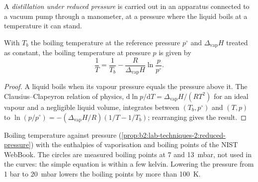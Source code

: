 \begin{definition}\label{def:b2:lab-techniques-2:reduced-pressure}
A \emph{distillation under reduced pressure} is carried out
in an apparatus connected to a vacuum pump through a manometer, at a pressure where the liquid boils at a
temperature it can stand.
\end{definition}

\begin{proposition}\label{prop:b2:lab-techniques-2:reduced-pressure}
With $T_b$ the boiling temperature at the reference pressure $p^\circ$ and $\Delta_{\mathrm{vap}}H$
treated as constant, the boiling temperature at pressure $p$ is given by
\begin{equation*}
\frac{1}{T} = \frac{1}{T_b} - \frac{R}{\Delta_{\mathrm{vap}}H}\ln\frac{p}{p^\circ}.
\end{equation*}
\end{proposition}

\begin{proof}
A liquid boils when its vapour pressure equals the pressure above it. The Clausius--Clapeyron relation
of physics, $\mathrm d\ln p/\mathrm dT = \Delta_{\mathrm{vap}}H/(RT^2)$ for an ideal vapour and a
negligible liquid volume, integrates between $(T_b, p^\circ)$ and $(T, p)$ to $\ln(p/p^\circ) =
-(\Delta_{\mathrm{vap}}H/R)(1/T - 1/T_b)$; rearranging gives the result.
\end{proof}

\begin{omfigure}

{\small Boiling temperature against pressure (\cref{prop:b2:lab-techniques-2:reduced-pressure}) with
the enthalpies of vaporisation and boiling points of the NIST WebBook. The circles are measured boiling
points at 7 and \qty{13}{mbar}, not used in the curves: the simple equation is within a few kelvin.
Lowering the pressure from 1 bar to \qty{20}{mbar} lowers the boiling points by more than
\qty{100}{K}.}
\end{omfigure}

